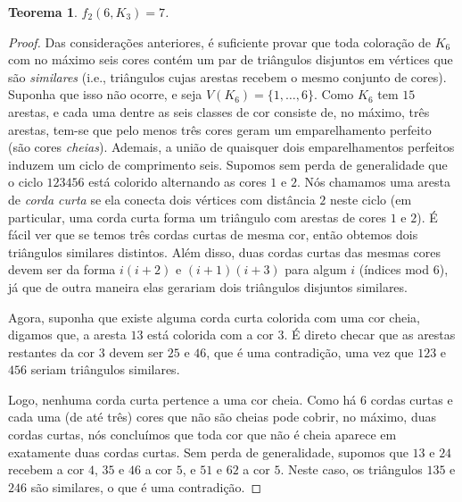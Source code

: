 \documentclass[12pt,a4paper]{book}
\newtheorem{teorema}{Teorema}[chapter]
\begin{document}
\begin{teorema}
       $f_2(6,K_3)=7$.
\end{teorema}
\begin{proof}
    Das considerações anteriores, é suficiente provar que 
    toda coloração de $K_6$ com no máximo seis cores contém um par de triângulos disjuntos em vértices que são \emph{similares} (i.e., triângulos cujas arestas recebem o mesmo conjunto de cores). 
   Suponha que isso não ocorre, e seja $V(K_6) =\{1,\dots,6\}$.
   Como $K_6$ tem $15$ arestas, e  cada uma dentre as seis classes de cor consiste de, no máximo, três arestas, tem-se que pelo menos três cores geram um emparelhamento perfeito (são cores \emph{cheias}). 
   Ademais, a união de quaisquer dois emparelhamentos perfeitos induzem um ciclo de comprimento seis.
   Supomos sem perda de generalidade que o ciclo $123456$ está colorido alternando as cores $1$ e $2$. 
   Nós chamamos uma aresta de \emph{corda curta} se ela conecta dois vértices com distância $2$ neste ciclo (em particular, uma corda curta forma um triângulo com arestas de cores $1$ e $2$). 
   É fácil ver que se temos três cordas curtas de mesma cor, então obtemos dois triângulos similares distintos. 
   Além disso, duas cordas curtas das mesmas cores devem ser da forma $i(i+2)$ e $(i+1)(i+3)$ para algum $i$ (índices mod $6$), já que de outra maneira elas gerariam dois triângulos disjuntos similares.
    
    Agora, suponha que existe alguma corda curta colorida com uma cor cheia, digamos que, a aresta $13$ está colorida com a cor $3$. É direto checar que as arestas restantes da cor $3$ devem ser $25$ e $46$, que é uma contradição, uma vez que $123$ e $456$ seriam triângulos similares.  
    
    Logo, nenhuma corda curta pertence a uma cor cheia. Como há $6$ cordas curtas e cada uma (de até três) cores que não são cheias pode cobrir, no máximo, duas cordas curtas, nós concluímos que toda cor que não é cheia aparece em exatamente duas cordas curtas. Sem perda de generalidade, supomos que $13$ e $24$ recebem a cor $4$, $35$ e $46$ a cor $5$, e $51$ e $62$ a cor $5$. Neste caso, os triângulos $135$ e $246$ são similares, o que é uma contradição.
\end{proof}
\end{document}
